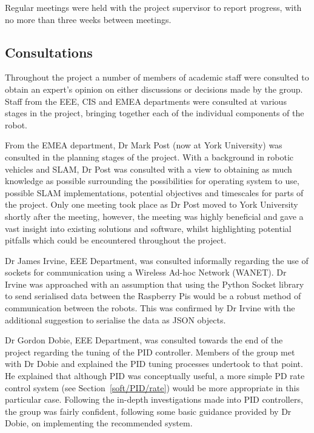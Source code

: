 Regular meetings were held with the project supervisor to report progress, with no 
more than three weeks between meetings.
	

\subsection{Consultations}\label{pm/consultations}
Throughout the project a number of members of academic staff 
were consulted to obtain an expert's opinion on either 
discussions or decisions made by the group. 
Staff from the EEE, CIS and EMEA departments were 
consulted at various stages in the project, bringing together 
each of the individual components of the robot. 

From the EMEA department, Dr Mark Post (now at York University) 
was consulted in the planning stages of the project. With a 
background in robotic vehicles and SLAM, Dr Post was consulted 
with a view to obtaining as much knowledge as possible 
surrounding the possibilities for operating system to use, 
possible SLAM implementations, potential objectives and 
timescales for parts of the project. Only one meeting took place 
as Dr Post moved to York University shortly after the meeting, 
however, the meeting was highly beneficial and gave a vast 
insight into existing solutions and software, whilst highlighting 
potential pitfalls which could be encountered throughout 
the project.

Dr James Irvine, EEE Department, was consulted informally  
regarding the use of sockets for communication using a Wireless 
Ad-hoc Network (WANET). Dr Irvine was approached with an 
assumption that using the Python Socket library to send 
serialised data between the Raspberry Pis would be a robust 
method of communication between the robots. This was confirmed 
by Dr Irvine with the additional suggestion to serialise the data
as JSON objects. 


Dr Gordon Dobie, EEE Department, was consulted towards the end 
of the project regarding the tuning of the PID controller. 
Members of the group met with Dr Dobie and explained the PID tuning 
processes undertook to that point. He explained that although 
PID was conceptually useful, a more simple PD rate control system (see Section~\ref{soft/PID/rate}) would be more appropriate 
in this particular case. Following the in-depth investigations made 
into PID controllers, the group was fairly confident, following some 
basic guidance provided by Dr Dobie, on implementing the 
recommended system. 

